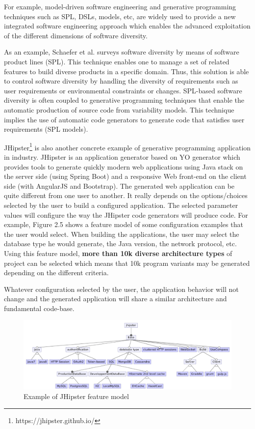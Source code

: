 For example, model-driven software engineering and generative programming techniques such as SPL, DSLs, models, etc, are widely used to provide a new integrated software engineering approach which enables the advanced exploitation of the different dimensions of software diversity.

As an example, Schaefer et al.\cite{schaefer2012software} surveys software diversity by means of software product lines (SPL). This technique enables one to manage a set of related features to build diverse products in a specific domain. Thus, this solution is able to control software diversity by handling the diversity of requirements such as user requirements or environmental constraints or changes. SPL-based software diversity is often coupled to generative programming techniques\cite{Czarnecki:2000:GPM:345203} that enable the automatic production of source code from variability models. This technique implies the use of automatic code generators to generate code that satisfies user requirements (SPL models).

JHipster\footnote{https://jhipster.github.io/} is also another concrete example of generative programming application in industry. JHipster is an application generator based on YO generator which provides tools to generate quickly modern web applications using Java stack on the server side (using Spring Boot) and a responsive Web front-end on the client side (with AngularJS and Bootstrap).
The generated web application can be quite different from one user to another. It really depends on the options/choices selected by the user to build a configured application. The selected parameter values will configure the way the JHipster code generators will produce code. 
For example, Figure 2.5 shows a feature model of some configuration examples that the user would select. When building the applications, the user may select the database type he would generate, the Java version, the network protocol, etc. 
Using this feature model, \textbf{more than 10k diverse architecture types} of project can be selected which means that 10k program variants may be generated depending on the different criteria.

Whatever configuration selected by the user, the application behavior will not change and the generated application will share a similar architecture and fundamental code-base.
\begin{figure}[h]
	\center
	\includegraphics[scale=0.65]{Background/fig/jhipster}
	\caption{Example of JHipster feature model}
\end{figure}



